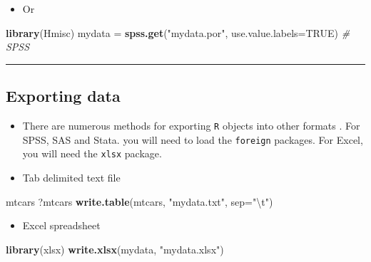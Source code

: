 \documentclass[]{article}
\def\tightlist{}
\newenvironment{Shaded}{\begin{snugshade}}{\end{snugshade}}
\newcommand{\KeywordTok}[1]{\textcolor[rgb]{0.13,0.29,0.53}{\textbf{{#1}}}}
\newcommand{\DataTypeTok}[1]{\textcolor[rgb]{0.13,0.29,0.53}{{#1}}}
\newcommand{\CharTok}[1]{\textcolor[rgb]{0.31,0.60,0.02}{{#1}}}
\newcommand{\StringTok}[1]{\textcolor[rgb]{0.31,0.60,0.02}{{#1}}}
\newcommand{\CommentTok}[1]{\textcolor[rgb]{0.56,0.35,0.01}{\textit{{#1}}}}
\newcommand{\OtherTok}[1]{\textcolor[rgb]{0.56,0.35,0.01}{{#1}}}
\newcommand{\NormalTok}[1]{{#1}}
\numberwithin{equation}{section}
\begin{document}
\begin{itemize}
\tightlist
\item
  Or
\end{itemize}

\begin{Shaded}
\begin{Highlighting}[]
\KeywordTok{library}\NormalTok{(Hmisc)}
\NormalTok{mydata =}\StringTok{ }\KeywordTok{spss.get}\NormalTok{(}\StringTok{"mydata.por"}\NormalTok{, }\DataTypeTok{use.value.labels=}\OtherTok{TRUE}\NormalTok{)  }\CommentTok{# SPSS}
\end{Highlighting}
\end{Shaded}

\begin{center}\rule{0.5\linewidth}{\linethickness}\end{center}

\subsection{Exporting data}\label{exporting-data}

\begin{itemize}
\item
  There are numerous methods for exporting \texttt{R} objects into other
  formats . For SPSS, SAS and Stata. you will need to load the
  \texttt{foreign} packages. For Excel, you will need the \texttt{xlsx}
  package.
\item
  Tab delimited text file
\end{itemize}

\begin{Shaded}
\begin{Highlighting}[]
\NormalTok{mtcars}
\NormalTok{?mtcars    }
\KeywordTok{write.table}\NormalTok{(mtcars, }\StringTok{"mydata.txt"}\NormalTok{, }\DataTypeTok{sep=}\StringTok{"}\CharTok{\textbackslash{}t}\StringTok{"}\NormalTok{) }
\end{Highlighting}
\end{Shaded}

\begin{itemize}
\tightlist
\item
  Excel spreadsheet
\end{itemize}

\begin{Shaded}
\begin{Highlighting}[]
\KeywordTok{library}\NormalTok{(xlsx)}
\KeywordTok{write.xlsx}\NormalTok{(mydata, }\StringTok{"mydata.xlsx"}\NormalTok{)}
\end{Highlighting}
\end{Shaded}
\end{document}
